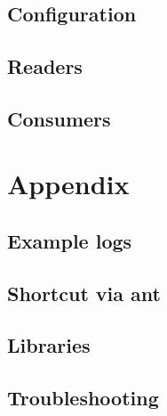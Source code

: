 \documentclass[a4paper, oneside, 11pt]{scrartcl}
\begin{document}
\section{\KiekerAnalysis}
\subsection{Configuration}
\subsection{Readers}
\subsection{Consumers}

\section{Appendix}
\subsection{Example logs}
\subsection{Shortcut via ant}
\subsection{Libraries}

\subsection{Troubleshooting}
\end{document}
